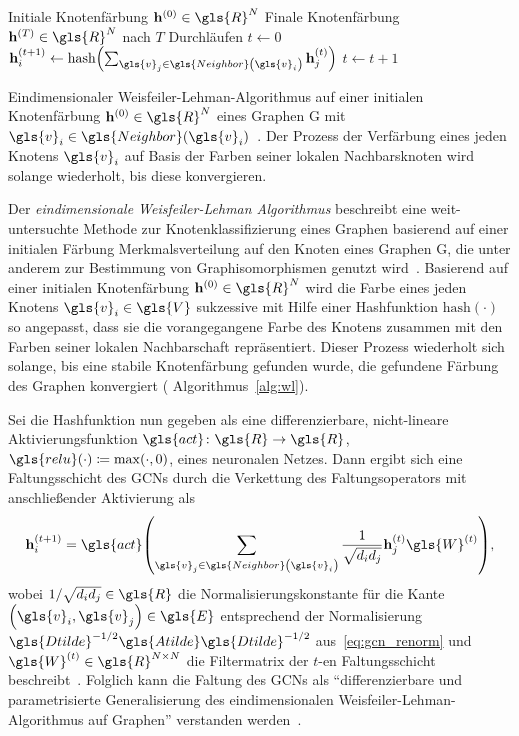 \begin{algorithm}[t]
\centering
\begin{algorithmic}
  \REQUIRE{} Initiale Knotenfärbung $\ve{h}^{\left(0\right)} \in \gls{R}^N$
  \ENSURE{} Finale Knotenfärbung $\ve{h}^{\left(T\right)} \in \gls{R}^N$ nach $T$ Durchläufen
  \STATE{} $t \leftarrow 0$
  \REPEAT{}
      \STATE{} $\ve{h}^{\left(t+1\right)}_i \leftarrow \mathrm{hash}\left(\sum_{\gls{v}_j \in \gls{Neighbor}\left(\gls{v}_i\right)} \ve{h}^{\left(t\right)}_j\right)$
    \ENDFOR{}
    \STATE{} $t \leftarrow t + 1$
\end{algorithmic}
  \caption[Weisfeiler-Lehman]{Eindimensionaler Weisfeiler-Lehman-Algorithmus auf einer initialen Knotenfärbung $\ve{h}^{\left(0\right)} \in \gls{R}^N$ eines Graphen \gls{G} mit $\gls{v}_i \in \gls{Neighbor}\left(\gls{v}_i\right)$~\cite{wl}. Der Prozess der Verfärbung eines jeden Knotens $\gls{v}_i$ auf Basis der Farben seiner lokalen Nachbarsknoten wird solange wiederholt, bis diese konvergieren.}
\label{alg:wl}
\end{algorithm}

Der \emph{eindimensionale Weis\-fei\-ler-Lehman Algorithmus} beschreibt eine weit-untersuchte Methode zur Knotenklassifizierung eines Graphen basierend auf einer initialen Färbung \bzw{} Merkmalsverteilung auf den Knoten eines Graphen \gls{G}, die unter anderem zur Bestimmung von Graphisomorphismen genutzt wird~\cite{douglas}.
Basierend auf einer initialen Knotenfärbung $\ve{h}^{\left(0\right)} \in \gls{R}^N$ wird die Farbe eines jeden Knotens $\gls{v}_i \in \gls{V}$ sukzessive mit Hilfe einer Hashfunktion $\mathrm{hash}\left(\cdot\right)$ so angepasst, dass sie die vorangegangene Farbe des Knotens zusammen mit den Farben seiner lokalen Nachbarschaft repräsentiert.
Dieser Prozess wiederholt sich solange, bis eine stabile Knotenfärbung gefunden wurde, \dhe{} die gefundene Färbung des Graphen konvergiert (\vgl{} Algorithmus~\ref{alg:wl}).

Sei die Hashfunktion nun gegeben als eine differenzierbare, nicht-lineare Aktivierungsfunktion $\gls{act} \colon \gls{R} \to \gls{R}$, \bspw{} $\gls{relu}\left(\cdot\right) \coloneqq \max\left(\cdot, 0\right)$, eines neuronalen Netzes.
Dann ergibt sich eine Faltungsschicht des \glspl{GCN} durch die Verkettung des Faltungsoperators mit anschließender Aktivierung als
\begin{equation*}
  \ve{h}^{\left(t+1\right)}_i = \gls{act}\left(\sum_{\gls{v}_j \in \gls{Neighbor}\left(\gls{v}_i\right)} \frac{1}{\sqrt{d_i d_j}} \ve{h}^{\left(t\right)}_j \gls{W}^{\left(t\right)} \right),
\end{equation*}
wobei $1/\sqrt{d_i d_j} \in \gls{R}$ die Normalisierungskonstante für die Kante $\left(\gls{v}_i, \gls{v}_j\right) \in \gls{E}$ entsprechend der Normalisierung $\gls{Dtilde}^{-1/2}\gls{Atilde}\gls{Dtilde}^{-1/2}$ aus~\eqref{eq:gcn_renorm} und $\gls{W}^{\left(t\right)} \in \gls{R}^{N \times N}$ die Filtermatrix der $t$-en Faltungsschicht beschreibt~\cite{gcn}.
Folglich kann die Faltung des \glspl{GCN} als \enquote{differenzierbare und parametrisierte Generalisierung des eindimensionalen Weisfeiler-Lehman-Algorithmus auf Graphen} verstanden werden~\cite{gcn}.
